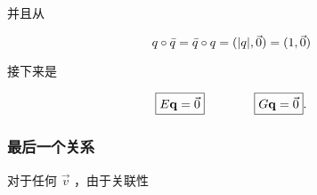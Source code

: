并且从

\begin{equation*}
q \circ \bar{q} = \bar{q} \circ q = (|q|, \vec{0}) = (1,\vec{0})    
\end{equation*}

接下来是

\begin{equation*}
\fbox{$E\mathbf{q} = \vec{0}$}    \qquad \qquad    \fbox{$G\mathbf{q} = \vec{0}$} .
\end{equation*}






\subsubsection{最后一个关系}

对于任何 $\vec{v}$ ，由于关联性

